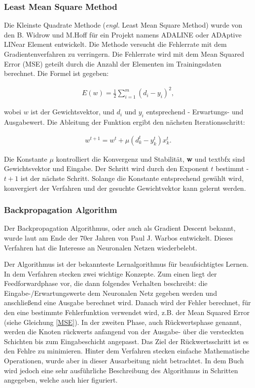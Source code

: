\subsubsection{Least Mean Square Method}
Die Kleinste Quadrate Methode (\textit{engl.} Least Mean Square Method) wurde von den B. Widrow und M.Hoff für ein Projekt namens ADALINE oder ADAptive LINear Element entwickelt. Die Methode versucht die Fehlerrate mit dem Gradientenverfahren zu verringern. Die Fehlerrate wird mit dem Mean Squared Error (MSE) geteilt durch die Anzahl der Elementen im Trainingsdaten berechnet. Die Formel ist gegeben:

\begin{align}
E(w) = \frac{1}{2} \sum_{i=1}^{m}(d_i - y_i)^2 \label{MSE}, 
\end{align}

wobei $w$ ist der Gewichtsvektor, und $d_i$ und $y_i$ entsprechend - Erwartungs- und Ausgabewert. Die Ableitung der Funktion ergibt den nächsten Iterationsschritt:

\begin{align}
w^{t+1} = w^t + \mu(d_k^t - y_k^t)x_k^t.
\end{align}

Die Konstante $\mu$ kontrolliert die Konvergenz und Stabilität, \textbf{w} und textbf{x} sind Gewichtsvektor und Eingabe. Der Schritt wird durch den Exponent $t$ bestimmt - $t+1$ ist der nächste Schritt. Solange die Konstante entsprechend gewählt wird, konvergiert der Verfahren und der gesuchte Gewichtvektor kann gelernt werden. \cite{SCTemassi:01}

\subsubsection{Backpropagation Algorithm}
Der Backpropagation Algorithmus, oder auch als Gradient Descent bekannt, wurde laut \cite{SCTemassi:01} am Ende der 70er Jahren von Paul J. Warbos entwickelt. Dieses Verfahren hat die Interesse an Neuronalen Netzen wiederbelebt.

Der Algorithmus ist der bekannteste Lernalgorithmus für beaufsichtigtes Lernen. In dem Verfahren stecken zwei wichtige Konzepte. Zum einen liegt der Feedforwardphase vor, die dann folgendes Verhalten beschreibt: die Eingabe-/Erwartungswerte dem Neuronalen Netz gegeben werden und anschließend eine Ausgabe berechnet wird. Danach wird der Fehler berechnet, für den eine bestimmte Fehlerfunktion verwendet wird, z.B. der Mean Squared Error (siehe Gleichung \ref{MSE}). In der zweiten Phase, auch Rückwertsphase genannt, werden die Knoten rückwerts anfangend von der Ausgabe- über die versteckten Schichten bis zum Eingabeschicht angepasst. Das Ziel der Rückwertsschritt ist es den Fehlre zu minimieren. Hinter dem Verfahren stecken einfache Mathematische Operationen, wurde aber in dieser Ausarbeitung nicht betrachtet. In dem Buch \cite{SCTemassi:01} wird jedoch eine sehr ausführliche Beschreibung des Algorithmus in Schritten angegeben, welche auch hier figuriert.

